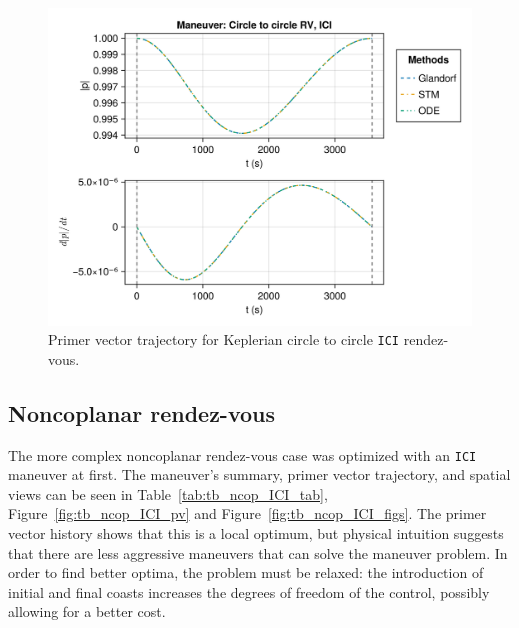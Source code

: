 \begin{figure}[htbp]
    \centering
    \includegraphics[width=\linewidth]{../results/two_body/hohmann/ICI_primer_vector.png}
    \caption{Primer vector trajectory for Keplerian circle to circle \texttt{ICI} rendez-vous.}
    \label{fig:tb_c2c_ICI_pv}
\end{figure}

\subsection{Noncoplanar rendez-vous}

The more complex noncoplanar rendez-vous case was optimized with an \texttt{ICI} maneuver at first. The maneuver's summary, primer vector trajectory, and spatial views can be seen in Table~\ref{tab:tb_ncop_ICI_tab}, Figure~\ref{fig:tb_ncop_ICI_pv} and Figure~\ref{fig:tb_ncop_ICI_figs}. The primer vector history shows that this is a local optimum, but physical intuition suggests that there are less aggressive maneuvers that can solve the maneuver problem. In order to find better optima, the problem must be relaxed: the introduction of initial and final coasts increases the degrees of freedom of the control, possibly allowing for a better cost.

